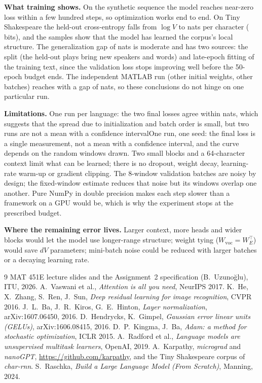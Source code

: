 \documentclass[11pt,a4paper]{article}
\numberwithin{equation}{section}
\newcommand{\T}{^{\top}}
\newcommand{\Wvoc}{W_{\mathrm{voc}}}
\begin{document}
\textbf{What training shows.} On the synthetic sequence the model reaches near-zero loss within a few hundred steps, so
optimization works end to end. On Tiny Shakespeare the held-out cross-entropy falls from $\log V$ to \Lvalfixed{} nats per
character (\BitsPerChar{} bits), and the samples show that the model has learned the corpus's local structure. The
generalization gap of \Lgap{} nats is moderate and has two sources: the split (the held-out plays bring new speakers and
words) and late-epoch fitting of the training text, since the validation loss stops improving well before the 50-epoch
budget ends.\ifnum{} The independent MATLAB run (other initial weights, other batches) reaches \MlLvalfixed{} with
a gap of \MlLgap{} nats, so these conclusions do not hinge on one particular run.\fi

\textbf{Limitations.} \ifnum{} One run per language: the two final losses agree within \MlValDiff{} nats, which
suggests that the spread due to initialization and batch order is small, but two runs are not a mean with a confidence
interval\else One run, one seed: the final loss is a single measurement, not a mean with a confidence interval\fi, and
the curve depends on the random windows drawn. Two small blocks and a 64-character context limit what can be learned;
there is no dropout, weight decay, learning-rate warm-up or gradient clipping. The 8-window validation batches are noisy by
design; the fixed-window estimate reduces that noise but its windows overlap one another. Pure NumPy in double precision
makes each step slower than a framework on a GPU would be, which is why the experiment stops at the prescribed budget.

\textbf{Where the remaining error lives.} Larger context, more heads and wider blocks would let the model use longer-range
structure; weight tying ($\Wvoc=W_E\T$) would save $dV$ parameters; mini-batch noise could be reduced with larger batches or
a decaying learning rate.

\begin{thebibliography}{9}\small
{} MAT 451E lecture slides and the Assignment~2 specification (B.~Uzunoğlu), ITU, 2026.
 A.~Vaswani et al., \emph{Attention is all you need}, NeurIPS 2017.
 K.~He, X.~Zhang, S.~Ren, J.~Sun, \emph{Deep residual learning for image recognition}, CVPR 2016.
 J.~L.~Ba, J.~R.~Kiros, G.~E.~Hinton, \emph{Layer normalization}, arXiv:1607.06450, 2016.
 D.~Hendrycks, K.~Gimpel, \emph{Gaussian error linear units (GELUs)}, arXiv:1606.08415, 2016.
 D.~P.~Kingma, J.~Ba, \emph{Adam: a method for stochastic optimization}, ICLR 2015.
 A.~Radford et al., \emph{Language models are unsupervised multitask learners}, OpenAI, 2019.
 A.~Karpathy, \emph{micrograd} and \emph{nanoGPT}, \url{https://github.com/karpathy}, and the Tiny Shakespeare corpus of \emph{char-rnn}.
 S.~Raschka, \emph{Build a Large Language Model (From Scratch)}, Manning, 2024.
\end{thebibliography}
\end{document}

